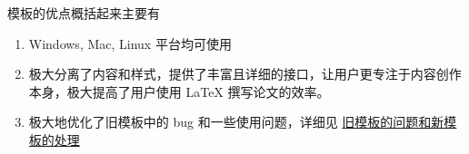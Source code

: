  模板的优点概括起来主要有
\begin{enumerate}
  \item Windows, Mac, Linux 平台均可使用
  \item 极大分离了内容和样式，提供了丰富且详细的接口，让用户更专注于内容创作本身，极大提高了用户使用 \LaTeX{} 撰写论文的效率。
  \item 极大地优化了旧模板中的 bug 和一些使用问题，详细见 \href{https://gitee.com/xkwxdyy/CCNUthesis/wikis/%E6%97%A7%E6%A8%A1%E7%89%88%E7%9A%84%E9%97%AE%E9%A2%98%E5%92%8C%E6%96%B0%E6%A8%A1%E7%89%88%E7%9A%84%E5%A4%84%E7%90%86}{旧模板的问题和新模板的处理}
\end{enumerate}